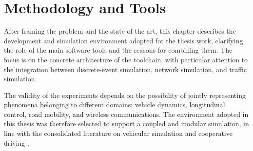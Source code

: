 \chapter{Methodology and Tools}
\label{env}

After framing the problem and the state of the art, this chapter describes the development and simulation environment adopted for the thesis work, clarifying the role of the main software tools and the reasons for combining them. The focus is on the concrete architecture of the toolchain, with particular attention to the integration between discrete-event simulation, network simulation, and traffic simulation.

The validity of the experiments depends on the possibility of jointly representing phenomena belonging to different domains: vehicle dynamics, longitudinal control, road mobility, and wireless communications. The environment adopted in this thesis was therefore selected to support a coupled and modular simulation, in line with the consolidated literature on vehicular simulation and cooperative driving \cite{varga2008overview,sommer2011bidirectionally,segata2014plexe,nardini2020simu5g}.
